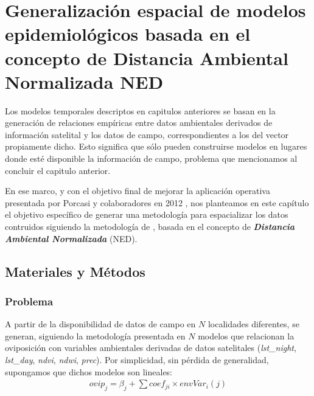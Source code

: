 %
%
%

\justifying

\chapter{Generalización espacial de modelos epidemiológicos basada en el
        concepto de Distancia Ambiental Normalizada NED}

  \par Los modelos temporales descriptos en capitulos anteriores se basan en la
    generación de relaciones empíricas entre datos ambientales derivados de
    información satelital y los datos de campo, correspondientes a los del vector
    propiamente dicho. Esto significa que sólo pueden construirse modelos en
    lugares donde esté disponible la información de campo, problema que mencionamos
    al concluir el capitulo anterior.

  \par En ese marco, y con el objetivo final de mejorar la aplicación operativa
    presentada por Porcasi y colaboradores en 2012 \cite{porcasi_operative},
    nos planteamos en este capítulo el objetivo específico de generar
    una metodología para espacializar los datos contruidos siguiendo la
    metodología de \cite{german_temporal}, basada en el concepto de
    \textbf{\textit{Distancia Ambiental Normalizada}} (NED).


\section{Materiales y Métodos}

\subsection{Problema}

  \par A partir de la disponibilidad de datos de campo en $N$ localidades
    diferentes, se generan, siguiendo la metodología presentada en \cite{german_temporal}
    $N$ modelos que relacionan la oviposición con variables ambientales
    derivadas de datos satelitales (\textit{lst\_night}, \textit{lst\_day},
    \textit{ndvi}, \textit{ndwi}, \textit{prec}). Por simplicidad, sin pérdida
    de generalidad, supongamos que dichos modelos son lineales:
    \begin{align}
      ovip_{j} = \beta_{j} + \sum{}{coef_{ji} \times envVar_{i}(j)}
    \end{align}

